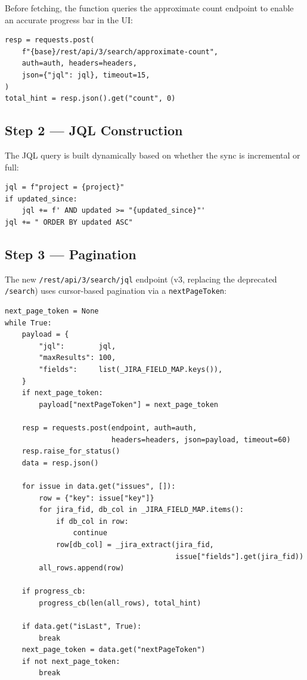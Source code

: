 \documentclass[12pt, a4paper]{article}
\begin{document}
Before fetching, the function queries the approximate count endpoint to enable an accurate
progress bar in the UI:

\begin{lstlisting}[style=python, caption={Pre-fetch count for progress bar}]
resp = requests.post(
    f"{base}/rest/api/3/search/approximate-count",
    auth=auth, headers=headers,
    json={"jql": jql}, timeout=15,
)
total_hint = resp.json().get("count", 0)
\end{lstlisting}

\subsection{Step 2 — JQL Construction}

The JQL query is built dynamically based on whether the sync is incremental or full:

\begin{lstlisting}[style=python, caption={JQL construction}]
jql = f"project = {project}"
if updated_since:
    jql += f' AND updated >= "{updated_since}"'
jql += " ORDER BY updated ASC"
\end{lstlisting}

\subsection{Step 3 — Pagination}

The new \texttt{/rest/api/3/search/jql} endpoint (v3, replacing the deprecated
\texttt{/search}) uses cursor-based pagination via a \texttt{nextPageToken}:

\begin{lstlisting}[style=python, caption={Cursor-based pagination loop}]
next_page_token = None
while True:
    payload = {
        "jql":        jql,
        "maxResults": 100,
        "fields":     list(_JIRA_FIELD_MAP.keys()),
    }
    if next_page_token:
        payload["nextPageToken"] = next_page_token

    resp = requests.post(endpoint, auth=auth,
                         headers=headers, json=payload, timeout=60)
    resp.raise_for_status()
    data = resp.json()

    for issue in data.get("issues", []):
        row = {"key": issue["key"]}
        for jira_fid, db_col in _JIRA_FIELD_MAP.items():
            if db_col in row:
                continue
            row[db_col] = _jira_extract(jira_fid,
                                        issue["fields"].get(jira_fid))
        all_rows.append(row)

    if progress_cb:
        progress_cb(len(all_rows), total_hint)

    if data.get("isLast", True):
        break
    next_page_token = data.get("nextPageToken")
    if not next_page_token:
        break
\end{lstlisting}
\end{document}
